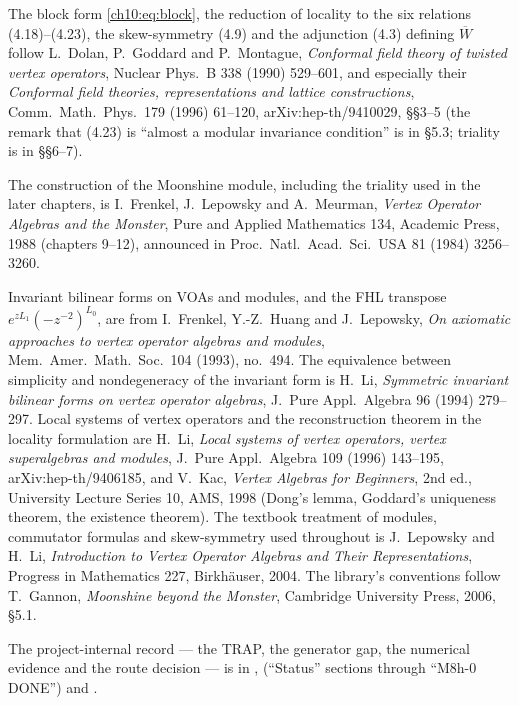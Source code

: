 The block form \eqref{ch10:eq:block}, the reduction of locality to the six relations
(4.18)--(4.23), the skew-symmetry (4.9) and the adjunction (4.3) defining $\overline W$ follow
L.~Dolan, P.~Goddard and P.~Montague, \emph{Conformal field theory of twisted vertex operators},
Nuclear Phys.\ B 338 (1990) 529--601, and especially their \emph{Conformal field theories,
representations and lattice constructions}, Comm.\ Math.\ Phys.\ 179 (1996) 61--120,
arXiv:hep-th/9410029, §§3--5 (the remark that (4.23) is ``almost a modular invariance condition''
is in §5.3; triality is in §§6--7).

The construction of the Moonshine module, including the triality used in the later chapters, is
I.~Frenkel, J.~Lepowsky and A.~Meurman, \emph{Vertex Operator Algebras and the Monster}, Pure and
Applied Mathematics 134, Academic Press, 1988 (chapters 9--12), announced in Proc.\ Natl.\ Acad.\
Sci.\ USA 81 (1984) 3256--3260.

Invariant bilinear forms on VOAs and modules, and the FHL transpose $e^{zL_1}(-z^{-2})^{L_0}$, are
from I.~Frenkel, Y.-Z.~Huang and J.~Lepowsky, \emph{On axiomatic approaches to vertex operator
algebras and modules}, Mem.\ Amer.\ Math.\ Soc.\ 104 (1993), no.~494.  The equivalence between
simplicity and nondegeneracy of the invariant form is H.~Li, \emph{Symmetric invariant bilinear
forms on vertex operator algebras}, J.\ Pure Appl.\ Algebra 96 (1994) 279--297.  Local systems of
vertex operators and the reconstruction theorem in the locality formulation are H.~Li, \emph{Local
systems of vertex operators, vertex superalgebras and modules}, J.\ Pure Appl.\ Algebra 109 (1996)
143--195, arXiv:hep-th/9406185, and V.~Kac, \emph{Vertex Algebras for Beginners}, 2nd ed.,
University Lecture Series 10, AMS, 1998 (Dong's lemma, Goddard's uniqueness theorem, the
existence theorem).  The textbook treatment of modules, commutator formulas and skew-symmetry
used throughout is J.~Lepowsky and H.~Li, \emph{Introduction to Vertex Operator Algebras and Their
Representations}, Progress in Mathematics 227, Birkhäuser, 2004.  The library's conventions follow
T.~Gannon, \emph{Moonshine beyond the Monster}, Cambridge University Press, 2006, §5.1.

The project-internal record --- the TRAP, the generator gap, the numerical evidence and the
route decision --- is in \leanpath{Notes/MonsterRoadmap.md}, 
(``Status'' sections through ``M8h-0 DONE'') and \leanpath{Notes/M8hRoute.md}.
